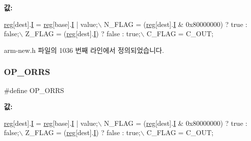 {\bfseries 값\+:}
\begin{DoxyCode}
\mbox{\hyperlink{_g_b_a_8h_ae29faba89509024ffd1a292badcedf2d}{reg}}[dest].\mbox{\hyperlink{unionreg__pair_a9f6a42d56c07829d7013571eda998252}{I}} = \mbox{\hyperlink{_g_b_a_8h_ae29faba89509024ffd1a292badcedf2d}{reg}}[base].\mbox{\hyperlink{unionreg__pair_a9f6a42d56c07829d7013571eda998252}{I}} | value;\(\backslash\)
    N\_FLAG = (\mbox{\hyperlink{_g_b_a_8h_ae29faba89509024ffd1a292badcedf2d}{reg}}[dest].\mbox{\hyperlink{unionreg__pair_a9f6a42d56c07829d7013571eda998252}{I}} & 0x80000000) ? \textcolor{keyword}{true} : \textcolor{keyword}{false};\(\backslash\)
    Z\_FLAG = (\mbox{\hyperlink{_g_b_a_8h_ae29faba89509024ffd1a292badcedf2d}{reg}}[dest].\mbox{\hyperlink{unionreg__pair_a9f6a42d56c07829d7013571eda998252}{I}}) ? \textcolor{keyword}{false} : \textcolor{keyword}{true};\(\backslash\)
    C\_FLAG = C\_OUT;
\end{DoxyCode}


arm-\/new.\+h 파일의 1036 번째 라인에서 정의되었습니다.

\mbox{\label{_g_b_a_8cpp_aa6aa149e69144102013a4cb4671f9fe3}} 
\subsubsection{\texorpdfstring{O\+P\+\_\+\+O\+R\+RS}{OP\_ORRS}\hspace{0.1cm}{\footnotesize\ttfamily [2/2]}}
{\footnotesize\ttfamily \#define O\+P\+\_\+\+O\+R\+RS}

{\bfseries 값\+:}
\begin{DoxyCode}
\mbox{\hyperlink{_g_b_a_8h_ae29faba89509024ffd1a292badcedf2d}{reg}}[dest].\mbox{\hyperlink{unionreg__pair_a9f6a42d56c07829d7013571eda998252}{I}} = \mbox{\hyperlink{_g_b_a_8h_ae29faba89509024ffd1a292badcedf2d}{reg}}[base].\mbox{\hyperlink{unionreg__pair_a9f6a42d56c07829d7013571eda998252}{I}} | value;\(\backslash\)
    N\_FLAG = (\mbox{\hyperlink{_g_b_a_8h_ae29faba89509024ffd1a292badcedf2d}{reg}}[dest].\mbox{\hyperlink{unionreg__pair_a9f6a42d56c07829d7013571eda998252}{I}} & 0x80000000) ? \textcolor{keyword}{true} : \textcolor{keyword}{false};\(\backslash\)
    Z\_FLAG = (\mbox{\hyperlink{_g_b_a_8h_ae29faba89509024ffd1a292badcedf2d}{reg}}[dest].\mbox{\hyperlink{unionreg__pair_a9f6a42d56c07829d7013571eda998252}{I}}) ? \textcolor{keyword}{false} : \textcolor{keyword}{true};\(\backslash\)
    C\_FLAG = C\_OUT;
\end{DoxyCode}
\mbox{\label{arm-new_8h_adf32c701a0a978533f69ce934229356b}} 
